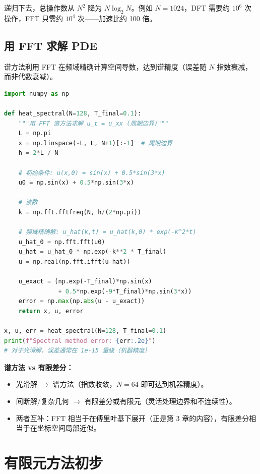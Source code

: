 递归下去，总操作数从 $N^2$ 降为 $N\log_2 N$。例如 $N=1024$，DFT 需要约 $10^6$ 次操作，FFT 只需约 $10^4$ 次——加速比约 100 倍。

\subsection{用 FFT 求解 PDE}

谱方法利用 FFT 在频域精确计算空间导数，达到谱精度（误差随 $N$ 指数衰减，而非代数衰减）。

\begin{lstlisting}[language=Python, caption=谱方法求解热传导方程]
import numpy as np

def heat_spectral(N=128, T_final=0.1):
    """用 FFT 谱方法求解 u_t = u_xx (周期边界)"""
    L = np.pi
    x = np.linspace(-L, L, N+1)[:-1]  # 周期边界
    h = 2*L / N

    # 初始条件: u(x,0) = sin(x) + 0.5*sin(3*x)
    u0 = np.sin(x) + 0.5*np.sin(3*x)

    # 波数
    k = np.fft.fftfreq(N, h/(2*np.pi))

    # 频域精确解: u_hat(k,t) = u_hat(k,0) * exp(-k^2*t)
    u_hat_0 = np.fft.fft(u0)
    u_hat = u_hat_0 * np.exp(-k**2 * T_final)
    u = np.real(np.fft.ifft(u_hat))

    u_exact = (np.exp(-T_final)*np.sin(x)
               + 0.5*np.exp(-9*T_final)*np.sin(3*x))
    error = np.max(np.abs(u - u_exact))
    return x, u, error

x, u, err = heat_spectral(N=128, T_final=0.1)
print(f"Spectral method error: {err:.2e}")
# 对于光滑解，误差通常在 1e-15 量级（机器精度）
\end{lstlisting}

\begin{insight}
\textbf{谱方法 vs 有限差分：}
\begin{itemize}
\item 光滑解 $\to$ 谱方法（指数收敛，$N=64$ 即可达到机器精度）。
\item 间断解/复杂几何 $\to$ 有限差分或有限元（灵活处理边界和不连续性）。
\item 两者互补：FFT 相当于在傅里叶基下展开（正是第 3 章的内容），有限差分相当于在坐标空间局部近似。
\end{itemize}
\end{insight}

\section{有限元方法初步}
\label{sec:fem_intro}

